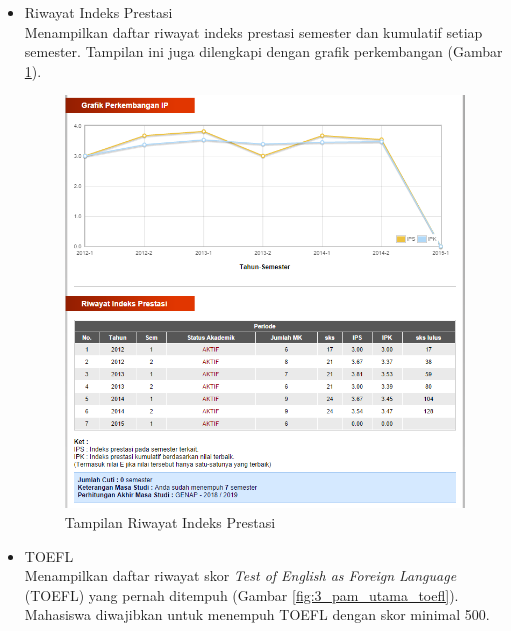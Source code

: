 \begin{enumerate}
\begin{itemize}
\begin{itemize}
			\item Riwayat Indeks Prestasi \\
			Menampilkan daftar riwayat indeks prestasi semester dan kumulatif setiap semester. Tampilan ini juga dilengkapi dengan grafik perkembangan (Gambar \ref{fig:3_pam_utama_ip}). 
			\begin{figure}[H]
				\centering
				\includegraphics[scale=0.5]{Gambar/pam-utama-ip}
				\caption{Tampilan Riwayat Indeks Prestasi} 
				\label{fig:3_pam_utama_ip}
			\end{figure}
			
			\item TOEFL \\
			Menampilkan daftar riwayat skor \textit{Test of English as Foreign Language} (TOEFL) yang pernah ditempuh (Gambar \ref{fig:3_pam_utama_toefl}). Mahasiswa diwajibkan untuk menempuh TOEFL dengan skor minimal 500.
			

\end{itemize}
\end{itemize}
\end{enumerate}
